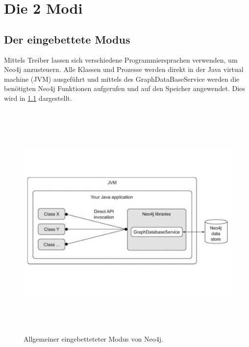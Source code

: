 
\chapter{Die 2 Modi} %

\label{Kaptiel4} %


\section{Der eingebettete Modus}

Mittels Treiber lassen sich verschiedene Programmiersprachen verwenden, um Neo4j anzusteuern. Alle Klassen und Prozesse werden direkt in der Java virtual machine (JVM) ausgeführt und mittels des GraphDataBaseService  werden die benötigten Neo4j Funktionen aufgerufen und auf den Speicher angewendet. Dies wird in \ref{fig:Embedded} dargestellt.
\begin{figure}[th]
	\centering
	\includegraphics [width=14cm, height=12cm]{Figures/Embedded}
	\caption[Eingebettet]{Allgemeiner eingebetteteter Modus von Neo4j.}
	\label{fig:Embedded}
\end{figure}


